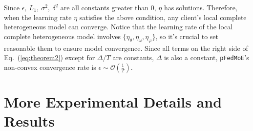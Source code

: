 \documentclass[sigconf]{acmart}
\newcommand{\hetero}{heterogeneous }
\newcommand{\methodname}{{\tt{pFedMoE}}}
\begin{document}
Since $\epsilon,\ L_1,\ \sigma^2,\ \delta^2$ are all constants greater than 0, $\eta$ has solutions.
Therefore, when the learning rate $\eta$ satisfies the above condition, any client's local complete \hetero model can converge. Notice that the learning rate of the local complete \hetero model involves $\{\eta_\theta,\eta_\omega,\eta_\varphi\}$, so it's crucial to set reasonable them to ensure model convergence. Since all terms on the right side of Eq.~(\ref{eq:theorem2}) except for $\Delta/T$ are constants, $\Delta$ is also a constant, \methodname{}'s non-convex convergence rate is $\epsilon \sim \mathcal{O}(\frac{1}{T})$.



\section{More Experimental Details and Results}\label{app:experiment}


\begin{table}[h]
\centering
\caption{Structures of $5$ heterogeneous CNN models with $5 \times 5$ kernel size and $16$ or $32$ filters in convolutional layers.}
\label{tab:model-structures}
\end{table}
\end{document}
